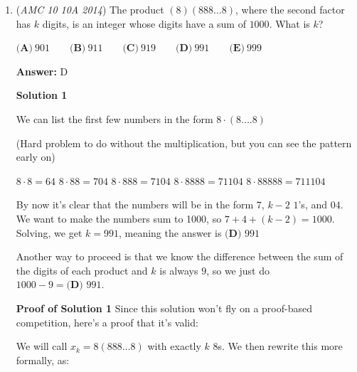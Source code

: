 \begin{enumerate}
 



\textbf{Solution 5}

Consider the bottom most point on the vertical of the $X$ to be $P$ and consider right triangle $XPY$, who has hypotenuse $2\sqrt{33}$ It follows that the rations within all cubes are equivalent. The smallest of them has length $r$, so $10r = 2\sqrt{33}$ and $r = \frac{\sqrt{33}}{5}$. It follows the segment contained within the cube of volume 27 is $3r = \boxed{\frac{3\sqrt{33}}{5}}$.

 The motivation for considering $r$ occurs from the homothety of all such right triangles similar to $XPY$ at respect $X$ of intervals along $XP$ of lengths 1, 2, 3, 4 respectively, thus the ration $1:2:3:4$, as desired.

 


	\item (\textit{AMC 10 10A 2014}) The product $(8)(888\dots8)$, where the second factor has $k$ digits, is an integer whose digits have a sum of $1000$.  What is $k$?


 $\textbf{(A)}\ 901\qquad\textbf{(B)}\ 911\qquad\textbf{(C)}\ 919\qquad\textbf{(D)}\ 991\qquad\textbf{(E)}\ 999$

 \textbf{Answer: }D



\textbf{Solution 1}

We can list the first few numbers in the form $8 \cdot (8....8)$

 (Hard problem to do without the multiplication, but you can see the pattern early on)

 $8 \cdot 8 = 64$
$8 \cdot 88 = 704$
$8 \cdot 888 = 7104$
$8 \cdot 8888 = 71104$
$8 \cdot 88888 = 711104$

 By now it's clear that the numbers will be in the form $7$, $k-2$ $1$'s, and $04$. We want to make the numbers sum to 1000, so $7+4+(k-2) = 1000$. Solving, we get $k = 991$, meaning the answer is $\boxed{\textbf{(D) } 991}$

 Another way to proceed is that we know the difference between the sum of the digits of each product and $k$ is always $9$, so we just do $1000-9=\boxed{\textbf{(D) } 991}$.

 \textbf{Proof of Solution 1} Since this solution won't fly on a proof-based competition, here's a proof that it's valid:

 We will call $x_k=8(888\dots8)$ with exactly $k$ $8$s. We then rewrite this more formally, as:


\end{enumerate}
